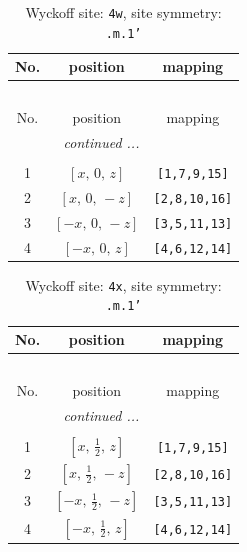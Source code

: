 \documentclass[fleqn,8pt]{jsarticle}
\begin{document}
\renewcommand{\arraystretch}{1.2}
\begin{longtable}{ccc}
\caption{Wyckoff site: {\tt 4w}, site symmetry: {\tt .m.1'}}
 \\
 \hline \hline
No. & position & mapping \\ \hline \endfirsthead

\multicolumn{2}{l}{\tablename\ \thetable{}} \\
 \hline \hline
No. & position & mapping \\ \hline \endhead

 \hline \hline
\multicolumn{2}{r}{\footnotesize\it continued ...} \\ \endfoot

 \hline \hline
\multicolumn{2}{r}{} \\ \endlastfoot

1 & $\left[ x,\, 0,\, z \right]$ & {\tt [1,7,9,15]} \\ \hline
2 & $\left[ x,\, 0,\, - z \right]$ & {\tt [2,8,10,16]} \\ \hline
3 & $\left[ - x,\, 0,\, - z \right]$ & {\tt [3,5,11,13]} \\ \hline
4 & $\left[ - x,\, 0,\, z \right]$ & {\tt [4,6,12,14]} \\
\end{longtable}
\renewcommand{\arraystretch}{1.2}
\begin{longtable}{ccc}
\caption{Wyckoff site: {\tt 4x}, site symmetry: {\tt .m.1'}}
 \\
 \hline \hline
No. & position & mapping \\ \hline \endfirsthead

\multicolumn{2}{l}{\tablename\ \thetable{}} \\
 \hline \hline
No. & position & mapping \\ \hline \endhead

 \hline \hline
\multicolumn{2}{r}{\footnotesize\it continued ...} \\ \endfoot

 \hline \hline
\multicolumn{2}{r}{} \\ \endlastfoot

1 & $\left[ x,\, \frac{1}{2},\, z \right]$ & {\tt [1,7,9,15]} \\ \hline
2 & $\left[ x,\, \frac{1}{2},\, - z \right]$ & {\tt [2,8,10,16]} \\ \hline
3 & $\left[ - x,\, \frac{1}{2},\, - z \right]$ & {\tt [3,5,11,13]} \\ \hline
4 & $\left[ - x,\, \frac{1}{2},\, z \right]$ & {\tt [4,6,12,14]} \\
\end{longtable}
\end{document}
